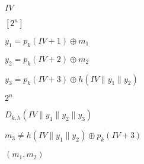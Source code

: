\documentclass[10pt]{book}
\begin{document}
\begin{mdSnippets}
\begin{mdInlineSnippet}[cf482c5807b62034beeabdb795c5a689]%
$IV$\end{mdInlineSnippet}%
\begin{mdInlineSnippet}[670871019e1f314005ef5e26af4be246]%
$[2^n]$\end{mdInlineSnippet}%
\begin{mdInlineSnippet}[02012976415a74833600c0a000086452]%
$y_1=p_k(IV+1)\oplus m_1$\end{mdInlineSnippet}%
\begin{mdInlineSnippet}[1d5de1f6bd14a9b545c6ea5c1ed32131]%
$y_2=p_k(IV+2) \oplus m_2$\end{mdInlineSnippet}%
\begin{mdInlineSnippet}%
$y_3=p_k(IV+3)\oplus h(IV\|y_1\|y_2)$\end{mdInlineSnippet}%
\begin{mdInlineSnippet}[d1db0d9c696a8c056e7117dbbb4ef6db]%
$2^n$\end{mdInlineSnippet}%
\begin{mdInlineSnippet}[900542f31cfb59ee90dd31c65f404237]%
$D_{k,h}(IV\|y_1\|y_2\|y_3)$\end{mdInlineSnippet}%
\begin{mdInlineSnippet}[2e1fc10a50e13600f8fde621316917df]%
$m_3 \neq h(IV\|y_1\|y_2)\oplus p_k(IV+3)$\end{mdInlineSnippet}%
\begin{mdInlineSnippet}[e990fa131877446dc5936877fa696155]%
$(m_1,m_2)$\end{mdInlineSnippet}%

\end{mdSnippets}
\end{document}

